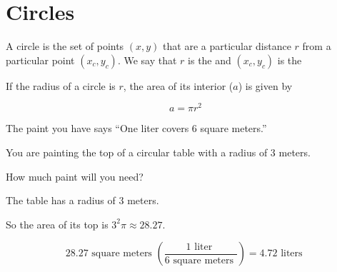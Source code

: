 \chapter{Circles}

A circle is the set of points $(x, y)$ that are a particular distance $r$ from a
particular point $(x_c, y_c)$.  We say that $r$ is the
 and $(x_c, y_c)$ is the 

\begin{center}
\end{center}


\begin{mdframed}[style=important, frametitle={Area and Radius}]

  If the radius of a circle is $r$, the area of its interior ($a$) is given 
  by 

  $$a = \pi r^2$$

\end{mdframed}

\begin{Exercise}[title={Area of a Circle}, label=area_of_circle]

  The paint you have says ``One liter covers 6 square meters.''

  You are painting the top of a circular table with a radius of 3 meters.

  How much paint will you need?
  
\end{Exercise}
\begin{Answer}[ref=area_of_circle]

  The table has a radius of 3 meters.

  So the area of its top is $3^2 \pi \approx 28.27$.

  $$ 28.27 \text{ square meters }\left(\frac{1 \text{ liter }}{6 \text{ square 
  meters }} \right) = 4.72 \text{ liters }$$ 
  
\end{Answer}


